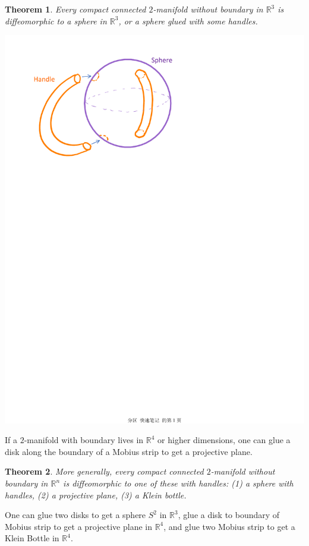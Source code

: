 \documentclass[15pt]{book}
\theoremstyle{break}
\theoremstyle{break}
\newtheorem{thm}{Theorem}[section]
\newcommand{\R}{\mathbb{R}}
\begin{document}
\newpage
\begin{thm}
Every compact connected $2$-manifold without boundary in $\R^3$ is diffeomorphic to a sphere in $\R^3$, or a sphere glued with some handles.
\begin{center}
\includegraphics[scale=0.8]{handleBody.pdf}
\end{center}
\end{thm}

If a $2$-manifold with boundary lives in $\R^4$ or higher dimensions, one can glue a disk along the boundary of a Mobius strip to get a projective plane.\\

\begin{thm}
More generally, every compact connected $2$-manifold without boundary in $\R^n$ is diffeomorphic to one of these with handles: (1) a sphere with handles, (2) a projective plane, (3) a Klein bottle.
\end{thm}

One can glue two disks to get a sphere $S^2$ in $\R^3$, glue a disk to boundary of Mobius strip to get a projective plane in $\R^4$, and glue two Mobius strip to get a Klein Bottle in $\R^4$.
\end{document}
